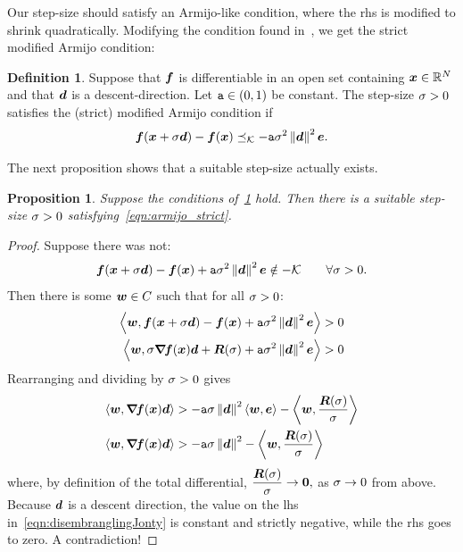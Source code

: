 \documentclass{article}
\theoremstyle{plain}
\newtheorem{proposition}[theorem]{Proposition}
\theoremstyle{definition}
\newtheorem{definition}[theorem]{Definition}
\begin{document}
Our step-size should satisfy an Armijo-like condition, where the \ac{rhs} is modified
to shrink quadratically.
Modifying the condition found in~\cite{lucambioperezNonlinearConjugateGradient2018}, 
we get the strict modified Armijo condition:
\begin{definition}\label{def:armijo_strict}
	Suppose that $\bm{f}$ is differentiable in an open set containing $\bm{x} \in \mathbb R^N$ and that 
	$\bm{d}$ is a descent-direction. 
	Let $\mathtt{a}\in(0,1)$ be constant. 
	The step-size $\sigma > 0$ satisfies the (strict) modified Armijo condition if 
	\begin{equation}
		\bm{f}(\bm{x} + \sigma\bm{d}) 
		- 
		\bm{f}(\bm{x}) 
		\preceq_\mathcal K
		-
		\mathtt{a} \sigma^2 \left\|\bm{d}\right\|^2 \bm{e}.
		\label{eqn:armijo_strict}
	\end{equation}
\end{definition}
The next proposition shows that a suitable step-size actually exists.
\begin{proposition}
	Suppose the conditions of~\cref{def:armijo_strict} hold.
	Then there is a suitable step-size $\sigma>0$ satisfying~\eqref{eqn:armijo_strict}.
\end{proposition}
\begin{proof}
	Suppose there was not:
	$$
	\bm{f}(\bm{x} + \sigma\bm{d}) 
	-
	\bm{f}(\bm{x})
	+ 
	\mathtt{a} \sigma^2 \left\|\bm{d}\right\|^2 \bm{e}
	\notin
	-\mathcal K \qquad \forall \sigma > 0.
	$$
	Then there is some $\bm{w}\in C$ such that for all $\sigma > 0$:
	\begin{align*}
		\left\langle 
			\bm{w}
		, 
			\bm{f}(\bm{x} + \sigma\bm{d}) 	 
			-
			\bm{f}(\bm{x})
			+ 
			\mathtt{a} \sigma^2 \left\|\bm{d}\right\|^2 \bm{e}
		 \right\rangle
	&
	> 
		0
	\\
	\left\langle 
			\bm{w}
		, 
			\sigma\bm{\nabla}\!\bm{f}(\bm{x})\bm{d}
			+ 
			\bm{R}(\sigma)
			+ 
			\mathtt{a} \sigma^2 \left\|\bm{d}\right\|^2 \bm{e}
		 \right\rangle
	&
	>
		0
	\end{align*}
	Rearranging and dividing by $\sigma > 0$ gives
	\begin{align}
	\left\langle \bm{w}, \bm{\nabla}\!\bm{f}(\bm{x})\bm{d} \right\rangle
	&>
	-
	\mathtt{a} \sigma \left\|\bm{d}\right\|^2 
	\left\langle \bm{w}, \bm{e} \right\rangle
	-
	\left\langle \bm{w}, \frac{\bm{R}(\sigma)}{\sigma} \right\rangle
	\nonumber
	\\
	\left\langle \bm{w}, \bm{\nabla}\!\bm{f}(\bm{x})\bm{d} \right\rangle
	&>
	-
	\mathtt{a} \sigma \left\|\bm{d}\right\|^2
	-
	\left\langle \bm{w}, \frac{\bm{R}(\sigma)}{\sigma} \right\rangle
	\label{eqn:disembranglingJonty}
	\end{align}
	where, by definition of the total differential, 
	$
	\dfrac{\bm{R}(\sigma)}{\sigma} \to \bm{0},
	$ 
	as $\sigma \to 0$ from above.
	Because $\bm{d}$ is a descent direction, the value on the \ac{lhs}
	in~\eqref{eqn:disembranglingJonty} is 
	constant and strictly negative, while the \ac{rhs} goes to zero.
	A contradiction!
\end{proof}
\end{document}

